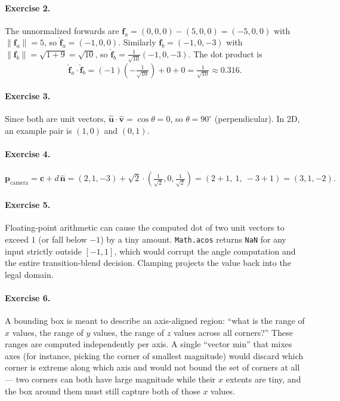 \documentclass{article}
\begin{document}
\paragraph{Exercise 2.}
The unnormalized forwards are $\mathbf{f}_a = (0,0,0) - (5,0,0) = (-5, 0, 0)$
with $\|\mathbf{f}_a\| = 5$, so $\hat{\mathbf{f}}_a = (-1, 0, 0)$. Similarly
$\mathbf{f}_b = (-1, 0, -3)$ with $\|\mathbf{f}_b\| = \sqrt{1 + 9} = \sqrt{10}$,
so $\hat{\mathbf{f}}_b = \tfrac{1}{\sqrt{10}}(-1, 0, -3)$. The dot product is
\[
\hat{\mathbf{f}}_a \cdot \hat{\mathbf{f}}_b
  = (-1)\!\left(-\tfrac{1}{\sqrt{10}}\right) + 0 + 0
  = \tfrac{1}{\sqrt{10}} \approx 0.316.
\]

\paragraph{Exercise 3.}
Since both are unit vectors, $\hat{\mathbf{u}} \cdot \hat{\mathbf{v}} = \cos\theta = 0$,
so $\theta = 90^\circ$ (perpendicular). In 2D, an example pair is
$(1, 0)$ and $(0, 1)$.

\paragraph{Exercise 4.}
\[
\mathbf{p}_{\text{camera}} = \mathbf{c} + d\,\hat{\mathbf{n}}
  = (2,1,-3) + \sqrt{2}\cdot\left(\tfrac{1}{\sqrt{2}}, 0, \tfrac{1}{\sqrt{2}}\right)
  = (2+1,\ 1,\ -3+1) = (3, 1, -2).
\]

\paragraph{Exercise 5.}
Floating-point arithmetic can cause the computed dot of two unit vectors to
exceed $1$ (or fall below $-1$) by a tiny amount. \texttt{Math.acos} returns
\texttt{NaN} for any input strictly outside $[-1, 1]$, which would corrupt
the angle computation and the entire transition-blend decision. Clamping
projects the value back into the legal domain.

\paragraph{Exercise 6.}
A bounding box is meant to describe an axis-aligned region: ``what is the
range of $x$ values, the range of $y$ values, the range of $z$ values
across all corners?'' These ranges are computed independently per axis. A
single ``vector min'' that mixes axes (for instance, picking the corner of
smallest magnitude) would discard which corner is extreme along which axis
and would not bound the set of corners at all --- two corners can both have
large magnitude while their $x$ extents are tiny, and the box around them
must still capture both of those $x$ values.
\end{document}
